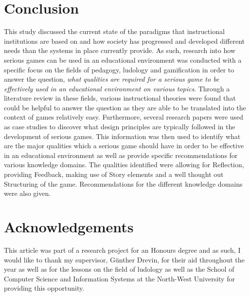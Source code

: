 \documentclass[conference]{IEEEtran}
\begin{document}
\section{Conclusion}
This study discussed the current state of the paradigms that instructional institutions are based on and how society has progressed and developed different needs than the systems in place currently provide. As such, research into how serious games can be used in an educational environment was conducted with a specific focus on the fields of pedagogy, ludology and gamification in order to answer the question, \textit{what qualities are required for a serious game to be effectively used in an educational environment on various topics}. Through a literature review in these fields, various instructional theories were found that could be helpful to answer the question as they are able to be translated into the context of games relatively easy. Furthermore, several research papers were used as case studies to discover what design principles are typically followed in the development of serious games. This information was then used to identify what are the major qualities which a serious game should have in order to be effective in an educational environment as well as provide specific recommendations for various knowledge domains. The qualities identified were allowing for Reflection, providing Feedback, making use of Story elements and a well thought out Structuring of the game. Recommendations for the different knowledge domains were also given.
\\
\section*{Acknowledgements}
This article was part of a research project for an Honours degree and as such, I would like to thank my supervisor, Günther Drevin, for their aid throughout the year as well as for the lessons on the field of ludology as well as the School of Computer Science and Information Systems at the North-West University for providing this opportunity.



\printbibliography
\end{document}

